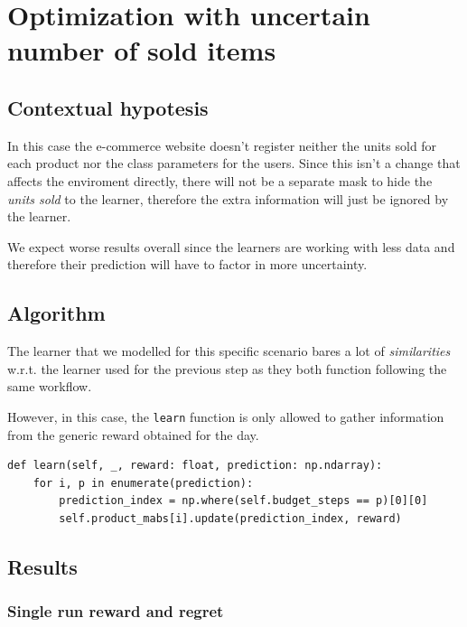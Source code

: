 \chapter{Optimization with uncertain number of sold items}
\label{chap:unc_items}

\section{Contextual hypotesis}
\label{sec:unc_it_hyp}

In this case the e-commerce website doesn't register neither the units sold for each product nor the class parameters for the users.
Since this isn't a change that affects the enviroment directly, there will not be a separate mask to hide the \textit{units sold} to the learner, therefore the extra information will just be ignored by the learner.

We expect worse results overall since the learners are working with less data and therefore their prediction will have to factor in more uncertainty.

\section{Algorithm}
\label{sec:unc_it_alg}

The learner that we modelled for this specific scenario bares a lot of \textit{similarities} w.r.t. the learner used for the previous step as they both function following the same workflow.

However, in this case, the \texttt{learn} function is only allowed to gather information from the generic reward obtained for the day.

\begin{lstlisting}[style=Python]
def learn(self, _, reward: float, prediction: np.ndarray):
	for i, p in enumerate(prediction):
		prediction_index = np.where(self.budget_steps == p)[0][0]
		self.product_mabs[i].update(prediction_index, reward)
\end{lstlisting}

\section{Results}
\label{sec:unc_it_res}

\subsection{Single run reward and regret}

